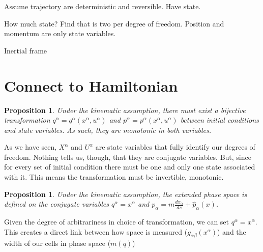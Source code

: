 \documentclass[aps,pra,10pt,twocolumn,floatfix,nofootinbib]{revtex4-1}
\newtheorem{prop}[thm]{Proposition}
\theoremstyle{definition}
\begin{document}






Assume trajectory are deterministic and reversible. Have state.

How much state? Find that is two per degree of freedom. Position and momentum are only state variables.

Inertial frame

\section{Connect to Hamiltonian}
\begin{prop}\label{continuousLabels}
Under the kinematic assumption, there must exist a bijective transformation $q^\alpha=q^\alpha(x^\alpha,u^\alpha)$ and $p^\alpha=p^\alpha(x^\alpha,u^\alpha)$ between initial conditions and state variables. As such, they are monotonic in both variables.
\end{prop}

As we have seen, $X^\alpha$ and $U^\alpha$ are state variables that fully identify our degrees of freedom. Nothing tells us, though, that
they are conjugate variables. But, since for every set of initial condition there must be one and only one state associated with it. This means the transformation must be invertible, monotonic.

\begin{prop}\label{continuousLabels}
Under the kinematic assumption, the extended phase space is defined on the conjugate variables $q^\alpha=x^\alpha$ and $p_\alpha=m\frac{dx_\alpha}{ds}+\hat{p}_\alpha(x)$.
\end{prop}

Given the degree of arbitrariness in choice of transformation, we can set $q^\alpha=x^\alpha$. This creates a direct link between how space is measured ($g_{\alpha\beta}(x^\alpha)$) and the width of our cells in phase space ($m(q)$)
\end{document}
